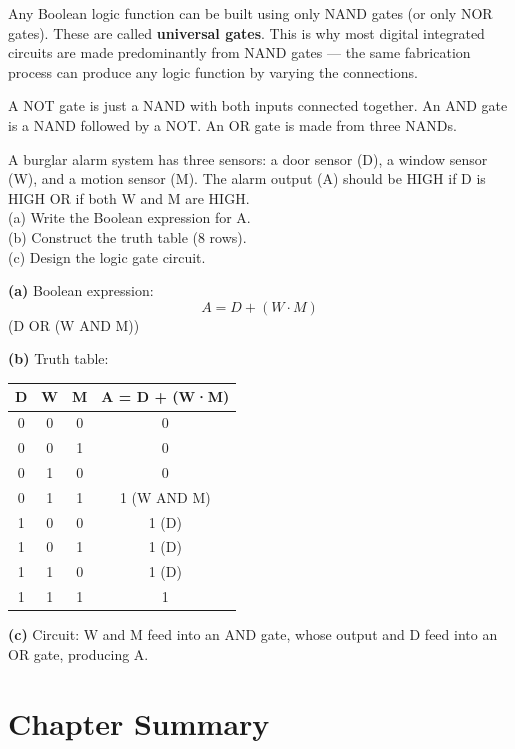 \begin{keybox}
Any Boolean logic function can be built using only
NAND gates (or only NOR gates). These are called
\textbf{universal gates}. This is why most digital
integrated circuits are made predominantly from
NAND gates --- the same fabrication process can
produce any logic function by varying the connections.

A NOT gate is just a NAND with both inputs connected
together. An AND gate is a NAND followed by a NOT.
An OR gate is made from three NANDs.
\end{keybox}

\begin{examplebox}[29.3]
A burglar alarm system has three sensors: a door
sensor (D), a window sensor (W), and a motion
sensor (M). The alarm output (A) should be HIGH
if D is HIGH OR if both W and M are HIGH.\\
(a) Write the Boolean expression for A.\\
(b) Construct the truth table (8 rows).\\
(c) Design the logic gate circuit.
\end{examplebox}

\begin{solutionbox}
\textbf{(a)} Boolean expression:
\[
  A = D + (W \cdot M)
\]
(D OR (W AND M))

\textbf{(b)} Truth table:
\begin{center}
\begin{tabular}{cccc}
\toprule
D & W & M & A = D + (W·M)\\
\midrule
0 & 0 & 0 & 0\\
0 & 0 & 1 & 0\\
0 & 1 & 0 & 0\\
0 & 1 & 1 & 1 (W AND M)\\
1 & 0 & 0 & 1 (D)\\
1 & 0 & 1 & 1 (D)\\
1 & 1 & 0 & 1 (D)\\
1 & 1 & 1 & 1\\
\bottomrule
\end{tabular}
\end{center}

\textbf{(c)} Circuit: W and M feed into an AND gate,
whose output and D feed into an OR gate, producing A.
\end{solutionbox}

\section{Chapter Summary}

